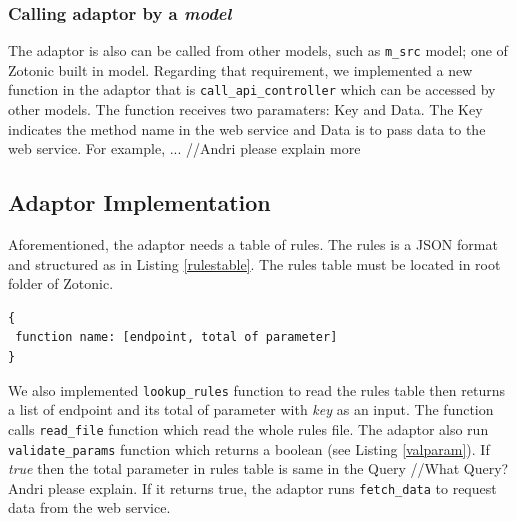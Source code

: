 \documentclass[conference]{IEEEtran}
\begin{document}
%

\subsubsection{Calling adaptor by a \textit{model}}
The adaptor is also can be called from other models, such as \texttt{m\_src} model; one of Zotonic built in model. Regarding that requirement, we implemented a new function in the adaptor that is \texttt{call\_api\_controller} which can be accessed by other models. The function receives two paramaters: Key and Data. The Key indicates the method name in the web service and Data is to pass data to the web service. For example, ... //Andri please explain more


% 
%

\subsection{Adaptor Implementation}
Aforementioned, the adaptor needs a table of rules. The rules is a JSON format and structured as in Listing \ref{rulestable}. The rules table must be located in root folder of Zotonic. 

\begin{lstlisting}[caption=Structure of Rules, label=rulestable]
{
 function name: [endpoint, total of parameter]
}
\end{lstlisting}

We also implemented \texttt{lookup\_rules} function to read the rules table then returns a list of endpoint and its total of parameter with \textit{key} as an input. The function calls \texttt{read\_file} function which read the whole rules file. The adaptor also run \texttt{validate\_params} function which returns a boolean (see Listing \ref{valparam}). If \textit{true} then the total parameter in rules table is same in the Query //What Query? Andri please explain. If it returns true, the adaptor runs \texttt{fetch\_data} to request data from the web service. 
\end{document}
